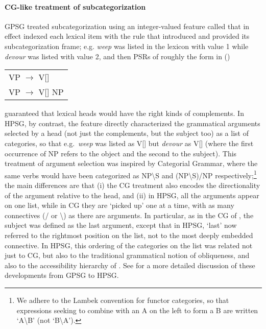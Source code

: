 \documentclass[output=paper
                ,modfonts
                ,nonflat
	        ,collection
	        ,collectionchapter
	        ,collectiontoclongg
 	        ,biblatex
                ,babelshorthands
                ,newtxmath
                ,draftmode
                ,colorlinks, citecolor=brown
]{./langsci/langscibook}
\begin{document}
\paragraph*{CG-like treatment of subcategorization} GPSG treated subcategorization using an integer-valued feature called \subcat that in effect indexed each lexical item with the rule that introduced and provided its subcategorization frame; e.g. \emph{weep} was listed in the lexicon with \subcat value 1 while \emph{devour} was listed with \subcat value 2, and then PSRs of roughly the form in ()
\ea
\begin{tabular}{l}
          VP $\rightarrow$ V[\subcat 1] \\
          VP $\rightarrow$ V[\subcat 2] NP
\end{tabular}
\z

\noindent
guaranteed that lexical heads would have the right kinds of complements.  In HPSG, by contrast, the
\subcat feature directly characterized the grammatical arguments selected by a head (not just the
complements, but the subject too) as a list of categories, so that e.g.~\emph{weep} was listed as
V[\subcat {}] but \emph{devour} as V[\subcat {}] (where the first occurrence of NP refers to the object and the second to the subject). This treatment of argument selection was inspired by Categorial Grammar, where the same verbs would have been categorized as NP{\textbackslash}S and (NP{\textbackslash}S)/NP respectively;\footnote{We adhere to the Lambek convention for functor categories, so that expressions seeking to combine with an A on the left to form a B are written `A{\textbackslash}B' (not `B{\textbackslash}A').} the main differences are that (i) the CG treatment also encodes the directionality of the argument relative to the head, and (ii) in HPSG, all the arguments appear on one list, while in CG they are `picked up' one at a time, with as many
connectives (/ or \textbackslash) as there are arguments. In particular, as in the CG of \citet{Dowty82b}, the subject was defined as the last argument, except that in HPSG, `last' now referred to the rightmost position on the \subcat list, not to the most deeply embedded connective. In HPSG, this
ordering of the categories on the \subcat list was related not just to CG, but also to the traditional grammatical notion of obliqueness, and also to the accessibility hierarchy of \citet{KC77a}.  See \citet[Section 4]{MWArgSt} for a more detailed discussion of these developments from GPSG to HPSG.
\end{document}
